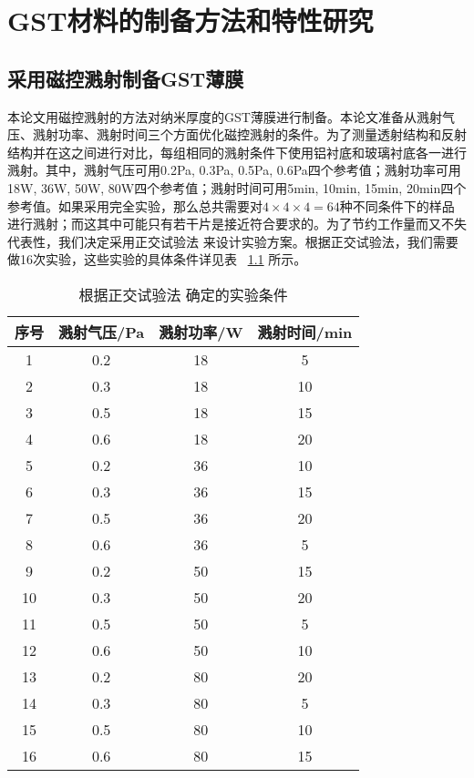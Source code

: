  \chapter{GST材料的制备方法和特性研究}
\label{chap:03}

\section{采用磁控溅射制备GST薄膜}
\label{sec:exp}

本论文用磁控溅射的方法对纳米厚度的GST薄膜进行制备。本论文准备从溅射气压、溅射功率、溅射时间三个方面优化磁控溅射的条件。为了测量透射结构和反射结构并在这之间进行对比，每组相同的溅射条件下使用铝衬底和玻璃衬底各一进行溅射。其中，溅射气压可用0.2Pa, 0.3Pa, 0.5Pa, 0.6Pa四个参考值；溅射功率可用18W, 36W, 50W, 80W四个参考值；溅射时间可用5min, 10min, 15min, 20min四个参考值。如果采用完全实验，那么总共需要对$4 \times 4 \times 4 = 64$种不同条件下的样品进行溅射；而这其中可能只有若干片是接近符合要求的。为了节约工作量而又不失代表性，我们决定采用正交试验法 \cite{ortho} 来设计实验方案。根据正交试验法，我们需要做16次实验，这些实验的具体条件详见表 ~\ref{tab:ortho} 所示。
\begin{table}[htbp]
  \centering
  \caption{根据正交试验法 \cite{ortho} 确定的实验条件}
  \label{tab:ortho}
  \begin{minipage}[t]{0.8\textwidth} 
    \begin{tabular}{|c|c|c|c|}
    \hline
    序号 & 溅射气压/Pa & 溅射功率/W & 溅射时间/min\\
    \hline \hline
    1 & 0.2 & 18 & 5 \\
    \cline{1-4}
    2 & 0.3 & 18 & 10 \\
    \cline{1-4}
    3 & 0.5 & 18 & 15 \\ 
    \cline{1-4}
    4 & 0.6 & 18 & 20 \\ 
    \cline{1-4}
    5 & 0.2 & 36 & 10 \\ 
    \cline{1-4}
    6 & 0.3 & 36 & 15 \\ 
    \cline{1-4}
    7 & 0.5 & 36 & 20 \\ 
    \cline{1-4}
    8 & 0.6 & 36 & 5 \\
    \cline{1-4}
    9 & 0.2 & 50 & 15 \\
    \cline{1-4}
    10 & 0.3 & 50 & 20 \\
    \cline{1-4}
    11 & 0.5 & 50 & 5 \\
    \cline{1-4}
    12 & 0.6 & 50 & 10 \\
    \cline{1-4}
    13 & 0.2 & 80 & 20 \\
    \cline{1-4}
    14 & 0.3 & 80 & 5 \\
    \cline{1-4}
    15 & 0.5 & 80 & 10 \\
    \cline{1-4}
    16 & 0.6 & 80 & 15 \\
    \hline
    \end{tabular}
  \end{minipage}
\end{table}
